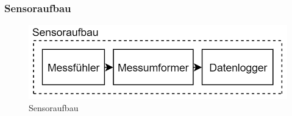 \subsubsection{Sensoraufbau}
\begin{figure}[h]
\centering
\includegraphics[scale=0.7]{graphics/Konzeptdiagramme/Sensoraufbau.PNG}
\caption{Sensoraufbau}
\label{fig:sensoraufbau}
\end{figure}

